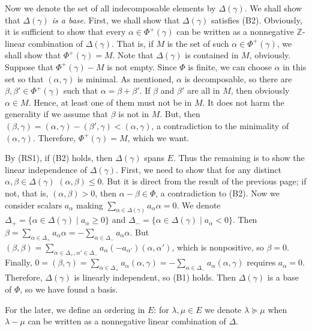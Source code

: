 \documentclass{article}
\newcommand{\InZ}{\mathbb{Z}}
\newcommand{\SBar}{\;|\;}
\begin{document}
Now we denote the set of all indecomposable elements by $\Delta(\gamma)$.
We shall show that \textit{$\Delta(\gamma)$ is a base}.
First, we shall show that $\Delta(\gamma)$ satisfies (B2).
Obviously, it is sufficient to show that every $\alpha \in \Phi^+(\gamma)$ can be written as a nonnegative $\InZ$-linear combination of $\Delta(\gamma)$.
That is, if $M$ is the set of such $\alpha \in \Phi^+(\gamma)$, we shall show that $\Phi^+(\gamma) = M$.
Note that $\Delta(\gamma)$ is contained in $M$, obviously.
Suppose that $\Phi^+(\gamma) - M$ is not empty.
Since $\Phi$ is finite, we can choose $\alpha$ in this set so that $(\alpha, \gamma)$ is minimal.
As mentioned, $\alpha$ is decomposable, so there are $\beta, \beta' \in \Phi^+(\gamma)$ such that $\alpha = \beta + \beta'$.
If $\beta$ and $\beta'$ are all in $M$, then obviously $\alpha \in M$.
Hence, at least one of them must not be in $M$.
It does not harm the generality if we assume that $\beta$ is not in $M$.
But, then $(\beta, \gamma) = (\alpha, \gamma) - (\beta', \gamma) < (\alpha, \gamma)$, a contradiction to the minimality of $(\alpha, \gamma)$.
Therefore, $\Phi^+(\gamma) = M$, which we want.

By (RS1), if (B2) holds, then $\Delta(\gamma)$ spans $E$.
Thus the remaining is to show the linear independence of $\Delta(\gamma)$.
First, we need to show that for any distinct $\alpha, \beta \in \Delta(\gamma)$ $(\alpha, \beta) \le 0$.
But it is direct from the result of the previous page; if not, that is, $(\alpha, \beta) > 0$, then $\alpha - \beta \in \Phi$, a contradiction to (B2).
Now we consider scalars $a_{\alpha}$ making $\sum_{\alpha \in \Delta(\gamma)} a_{\alpha} \alpha = 0$.
We denote $\Delta_+ = \{\alpha \in \Delta(\gamma) \SBar a_{\alpha} \ge 0\}$ and $\Delta_- = \{\alpha \in \Delta(\gamma) \SBar a_{\alpha} < 0\}$.
Then $\beta = \sum_{\alpha \in \Delta_+} a_{\alpha} \alpha = -\sum_{\alpha \in \Delta_-} a_{\alpha} \alpha$.
But $(\beta, \beta) = \sum_{\alpha \in \Delta_+, \alpha' \in \Delta_-} a_{\alpha} (-a_{\alpha'}) (\alpha, \alpha')$, which is nonpositive, so $\beta = 0$.
Finally, $0 = (\beta, \gamma) = \sum_{\alpha \in \Delta_+} a_{\alpha} (\alpha, \gamma) = -\sum_{\alpha \in \Delta_-} a_{\alpha} (\alpha, \gamma)$ requires $a_{\alpha} = 0$.
Therefore, $\Delta(\gamma)$ is linearly independent, so (B1) holds.
Then $\Delta(\gamma)$ is a base of $\Phi$, so we have found a basis.

For the later, we define an ordering in $E$: for $\lambda , \mu \in E$ we denote $\lambda \succeq \mu$ when $\lambda - \mu$ can be written as a nonnegative linear combination of $\Delta$.
\end{document}
